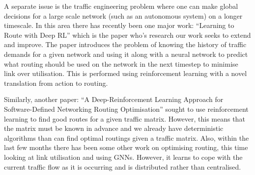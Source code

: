 A separate issue is the traffic engineering problem where one can make global decisions for a large scale network (such as an autonomous system) on a longer timescale. In this area there has recently been one major work: ``Learning to Route with Deep RL''\cite{valadarsky2017learning} which is the paper who's research our work seeks to extend and improve. The paper introduces the problem of knowing the history of traffic demands for a given network and using it along with a neural network to predict what routing should be used on the network in the next timestep to minimise link over utilisation. This is performed using reinforcement learning with a novel translation from action to routing.

Similarly, another paper: ``A Deep-Reinforcement Learning Approach for Software-Defined Networking Routing Optimisation''\cite{stampa2017deep} sought to use reinforcement learning to find good routes for a given traffic matrix. However, this means that the matrix must be known in advance and we already have deterministic algorithms than can find optimal routings given a traffic matrix. Also, within the last few months there has been some other work on optimising routing, this time looking at link utilisation and using GNNs\cite{Sawada2020NetworkRO}. However, it learns to cope with the current traffic flow as it is occurring and is distributed rather than centralised.
